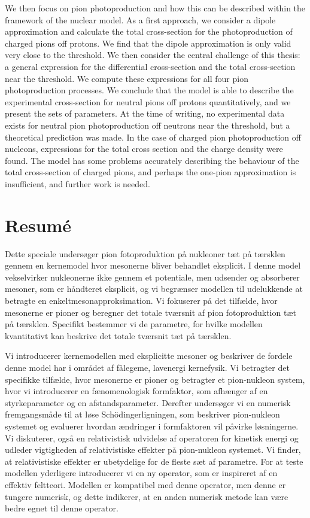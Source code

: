 We then focus on pion photoproduction and how this can be described within the framework of the nuclear model. As a first approach, we consider a dipole approximation and calculate the total cross-section for the photoproduction of charged pions off protons. We find that the dipole approximation is only valid very close to the threshold. We then consider the central challenge of this thesis: a general expression for the differential cross-section and the total cross-section near the threshold. We compute these expressions for all four pion photoproduction processes. We conclude that the model is able to describe the experimental cross-section for neutral pions off protons quantitatively, and we present the sets of parameters. At the time of writing, no experimental data exists for neutral pion photoproduction off neutrons near the threshold, but a theoretical prediction was made. In the case of charged pion photoproduction off nucleons, expressions for the total cross section and the charge density were found. The model has some problems accurately describing the behaviour of the total cross-section of charged pions, and perhaps the one-pion approximation is insufficient, and further work is needed.

\newpage
\section*{Resumé}
Dette speciale undersøger pion fotoproduktion på nukleoner tæt på tærsklen gennem en kernemodel hvor mesonerne bliver behandlet eksplicit. I denne model vekselvirker nukleonerne ikke gennem et potentiale, men udsender og absorberer mesoner, som er håndteret eksplicit, og vi begrænser modellen til udelukkende at betragte en enkeltmesonapproksimation. Vi fokuserer på det tilfælde, hvor mesonerne er pioner og beregner det totale tværsnit af pion fotoproduktion tæt på tærsklen. Specifikt bestemmer vi de parametre, for hvilke modellen kvantitativt kan beskrive det totale tværsnit tæt på tærsklen. 

Vi introducerer kernemodellen med eksplicitte mesoner og beskriver de fordele denne model har i området af fålegeme, lavenergi kernefysik. Vi betragter det specifikke tilfælde, hvor mesonerne er pioner og betragter et pion-nukleon system, hvor vi introducerer en  fænomenologisk formfaktor, som afhænger af en styrkeparameter og en afstandsparameter. Derefter undersøger vi en numerisk fremgangsmåde til at løse Schödingerligningen, som beskriver pion-nukleon systemet og evaluerer hvordan  ændringer i formfaktoren vil påvirke løsningerne. Vi diskuterer, også en relativistisk udvidelse af operatoren for kinetisk energi og udleder vigtigheden af relativistiske effekter på pion-nukleon systemet. Vi finder, at relativistiske effekter er ubetydelige for de fleste sæt af parametre. For at teste modellen yderligere introducerer vi en ny operator, som er inspireret af en effektiv feltteori. Modellen er kompatibel med denne operator, men denne er tungere numerisk, og dette indikerer, at en anden numerisk metode kan være bedre egnet til denne operator.

